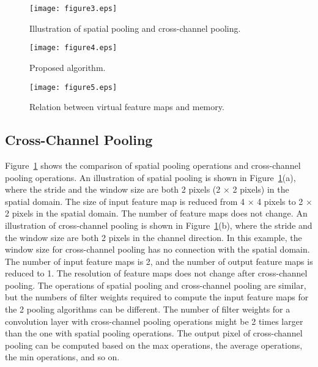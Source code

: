 \documentclass[10pt,twocolumn,letterpaper]{article}
\begin{document}
\begin{figure}[t]
\begin{center}
\texttt{[image: figure3.eps]}
\end{center}
   \caption{Illustration of spatial pooling and cross-channel pooling.}
\label{fig:pooling}
\end{figure}

\begin{figure*}[t]
\begin{center}
\texttt{[image: figure4.eps]}
\end{center}
   \caption{Proposed algorithm.}
\label{fig:flowchart}
\end{figure*}

\begin{figure*}[t]
\begin{center}
\texttt{[image: figure5.eps]}
\end{center}
   \caption{Relation between virtual feature maps and memory.}
\label{fig:relation}
\end{figure*}

\subsection{Cross-Channel Pooling}
\label{subsec:ccpooling}

Figure~\ref{fig:pooling} shows the comparison of spatial pooling operations and cross-channel pooling operations. An illustration of spatial pooling is shown in Figure~\ref{fig:pooling}(a), where the stride and the window size are both 2 pixels (2 $\times$ 2 pixels) in the spatial domain. The size of input feature map is reduced from 4 $\times$ 4 pixels to 2 $\times$ 2 pixels in the spatial domain. The number of feature maps does not change. An illustration of cross-channel pooling is shown in Figure~\ref{fig:pooling}(b), where the stride and the window size are both 2 pixels in the channel direction. In this example, the window size for cross-channel pooling has no connection with the spatial domain. The number of input feature maps is 2, and the number of output feature maps is reduced to 1. The resolution of feature maps does not change after cross-channel pooling. The operations of spatial pooling and cross-channel pooling are similar, but the numbers of filter weights required to compute the input feature maps for the 2 pooling algorithms can be different. The number of filter weights for a convolution layer with cross-channel pooling operations might be 2 times larger than the one with spatial pooling operations. The output pixel of cross-channel pooling can be computed based on the max operations, the average operations, the min operations, and so on.
\end{document}
